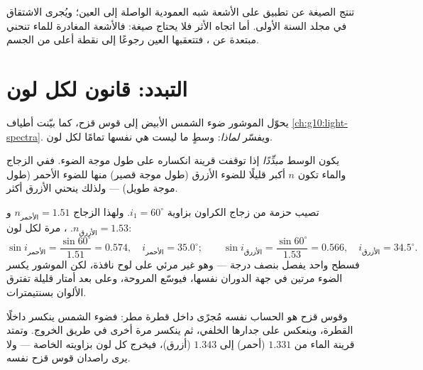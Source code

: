 \begin{remark}\label{rem:g10:refraction:depthhonest}
تنتج الصيغة عن تطبيق  على الأشعة شبه العمودية
الواصلة إلى العين؛ ويُجرى الاشتقاق في مجلد السنة الأولى. أما
اتجاه الأثر فلا يحتاج صيغة: فالأشعة المغادرة للماء تنحني
مبتعدة عن ، فتتعقبها العين رجوعًا إلى نقطة أعلى
من الجسم.
\end{remark}

\section{التبدد: قانون لكل لون}

يحوّل الموشور ضوء الشمس الأبيض إلى قوس قزح، كما بيّنت أطياف
\cref{ch:g10:light-spectra}. ويفسّر  \emph{لماذا}:
 وسطٍ ما ليست هي نفسها تمامًا لكل لون.

\begin{definition}[التبدد]\label{def:g10:refraction:dispersion}
يكون الوسط \emph{مبدِّدًا} إذا توقفت قرينة
انكساره على طول موجة الضوء. ففي الزجاج والماء تكون $n$
أكبر قليلًا للضوء الأزرق (طول موجة قصير) منها للضوء الأحمر
(طول موجة طويل) --- ولذلك ينحني الأزرق أكثر.
\end{definition}

\begin{example}\label{ex:g10:refraction:twocolors}
تصيب حزمة من  زجاج الكراون بزاوية $i_1 = 60^\circ$. ولهذا
الزجاج $n_{\text{الأحمر}} = 1.51$ و$n_{\text{الأزرق}} = 1.53$. ،
مرة لكل لون:
\[
\sin i_{\text{الأحمر}} = \frac{\sin 60^\circ}{1.51} = 0.574,
\quad i_{\text{الأحمر}} = 35.0^\circ ;
\qquad
\sin i_{\text{الأزرق}} = \frac{\sin 60^\circ}{1.53} = 0.566,
\quad i_{\text{الأزرق}} = 34.5^\circ .
\]
فسطح واحد يفصل  بنصف درجة --- وهو غير مرئي على
لوح نافذة، لكن الموشور يكسر الضوء مرتين في جهة الدوران نفسها،
فيوسّع المروحة، وعلى بعد أمتار قليلة تفترق الألوان بسنتيمترات.
\end{example}

\begin{remark}\label{rem:g10:refraction:rainbow}
وقوس قزح هو الحساب نفسه مُجرًى داخل قطرة مطر: فضوء الشمس
ينكسر داخلًا القطرة، وينعكس على جدارها الخلفي، ثم ينكسر
مرة أخرى في طريق الخروج. وتمتد قرينة الماء من $1.331$ (أحمر) إلى $1.343$
(أزرق)، فيخرج كل لون بزاويته الخاصة --- ولا يرى راصدان
قوس قزح نفسه.
\end{remark}

